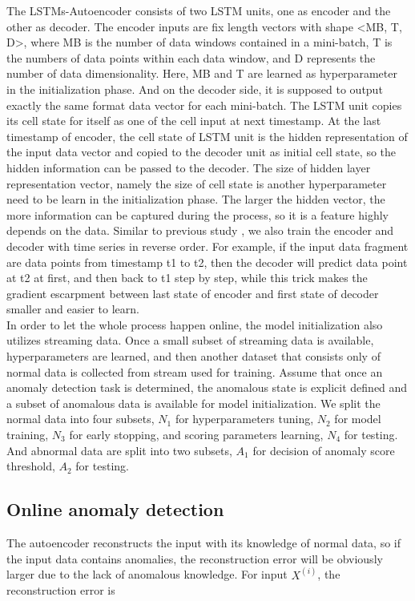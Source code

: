 The LSTMs-Autoencoder consists of two LSTM units, one as encoder and the other as decoder. The encoder inputs are fix length vectors with shape <MB, T, D>, where MB is the number of data windows contained in a mini-batch, T is the numbers of data points within each data window, and D represents the number of data dimensionality. Here, MB and T are learned as hyperparameter in the initialization phase. And on the decoder side, it is supposed to output exactly the same format data vector for each mini-batch. The LSTM unit copies its cell state for itself as one of the cell input at next timestamp. At the last timestamp of encoder, the cell state of LSTM unit is the hidden representation of the input data vector and copied to the decoder unit as initial cell state, so the hidden information can be passed to the decoder. The size of hidden layer representation vector, namely the size of cell state is another hyperparameter need to be learn in the initialization phase. The larger the hidden vector, the more information can be captured during the process, so it is a feature highly depends on the data. Similar to previous study \cite{seq2seq}, we also train the encoder and decoder with time series in reverse order. For example, if the input data fragment are data points from timestamp t1 to t2, then the decoder will predict data point at t2 at first, and then back to t1 step by step, while this trick makes the gradient escarpment between last state of encoder and first state of decoder smaller and easier to learn. \\

In order to let the whole process happen online, the model initialization also utilizes streaming data. Once a small subset of streaming data is available, hyperparameters are learned, and then another dataset that consists only of normal data is collected from stream used for training. Assume that once an anomaly detection task is determined, the anomalous state is explicit defined and a subset of anomalous data is available for model initialization. We split the normal data into four subsets, $N_1$ for hyperparameters tuning, $N_2$ for model training, $N_3$ for early stopping, and scoring parameters learning, $N_4$ for testing. And abnormal data are split into two subsets, $A_1$ for decision of anomaly score threshold, $A_2$ for testing.

\subsection{Online anomaly detection}
\label{anomalydetection}
The autoencoder reconstructs the input with its knowledge of normal data, so if the input data contains anomalies, the reconstruction error will be obviously larger due to the lack of anomalous knowledge. For input $X^{(i)}$, the reconstruction error is 

